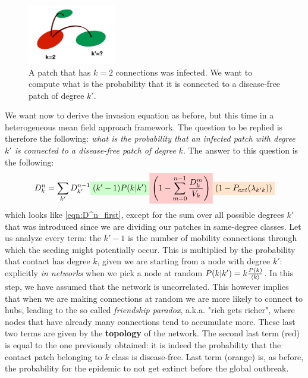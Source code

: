 \documentclass[../main/main.tex]{subfiles}
\begin{document}
\begin{figure}[h!]
\centering
\includegraphics[width=0.34\textwidth]{../lessons/image/16/image05.png}
\caption{\label{fig:16_05} A patch that has $k=2$ connections was infected. We want to compute what is the probability that it is connected to a disease-free patch of degree $k'$.}
\end{figure}

We want now to derive the invasion equation as before, but this time in a heterogeneous mean field approach framework. The question to be replied is therefore the following: \textit{what is the probability that an infected patch with degree $k'$ is connected to a disease-free patch of degree} $k$. The answer to this question is the following:
\begin{equation}
    D_k^n = \sum_{k'}D_{k'}^{n-1} \mathcolorbox{green!20}{(k'-1) P (k|k')} \mathcolorbox{red!20}{\qty( 1-\sum_{m=0}^{n-1} \frac{D_{k}^m}{V_{k}} ) } \mathcolorbox{orange!20}{ (1-P_{ext}(\lambda_{k'k})) }
    \label{eqn:D_k^n}
\end{equation}
which looks like \ref{eqn:D^n_first}, except for the sum over all possible degrees $k'$ that was introduced since we are dividing our patches in same-degree classes. Let us analyze every term: the $k'-1$ is the number of mobility connections through which the seeding might potentially occur. This is multiplied by the probability that contact has degree $k$, given we are starting from a node with degree $k'$: explicitly \textit{in networks} when we pick a node at random $P(k|k') = k \frac{P(k)}{\expval{k}}$. In this step, we have assumed that the network is uncorrelated. This however implies that when we are making connections at random we are more likely to connect to hubs, leading to the so called \textit{friendship paradox}, a.k.a. "rich gets richer", where nodes that have already many connections tend to accumulate more. These last two terms are given by the \textbf{topology} of the network.
The second last term (red) is equal to the one previously obtained: it is indeed the probability that the contact patch belonging to $k$ class is disease-free. Last term (orange) is, as before, the probability for the epidemic to not get extinct before the global outbreak.
\end{document}

